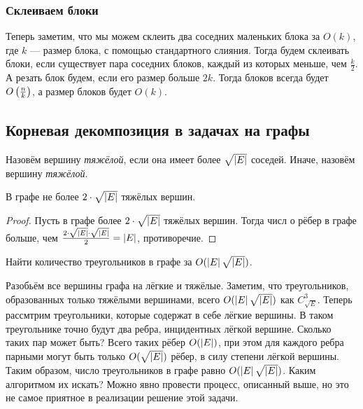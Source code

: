 \subsubsection{Склеиваем блоки}

Теперь заметим, что мы можем склеить два соседних маленьких блока за $O(k)$, где $k$ --- размер блока, с помощью стандартного слияния. Тогда будем склеивать блоки, если существует пара соседних блоков, каждый из которых меньше, чем $\frac{k}{2}$. А резать блок будем, если его размер больше $2k$. Тогда блоков всегда будет $O\left(\frac{n}{k}\right)$, а размер блоков будет $O(k)$.

\subsection{Корневая декомпозиция в задачах на графы}

\begin{definition}
    Назовём вершину \textit{тяжёлой}, если она имеет более $\sqrt{\left\lvert E\right\rvert}$ соседей. Иначе, назовём вершину \textit{тяжёлой}.
\end{definition}

\begin{lemma}
    В графе не более $2 \cdot \sqrt{\left\lvert E\right\rvert}$ тяжёлых вершин.
\end{lemma}

\begin{proof}
    Пусть в графе более $2 \cdot \sqrt{\left\lvert E\right\rvert}$ тяжёлых вершин. Тогда числ о рёбер в графе больше, чем $\frac{2 \cdot \sqrt{\left\lvert E\right\rvert} \cdot \sqrt{\left\lvert E\right\rvert}}{2} = \left\lvert E\right\rvert$, противоречие.
\end{proof}

\begin{problem}
    Найти количество треугольников в графе за $O(\left\lvert E\right\rvert\sqrt{\left\lvert E\right\rvert})$.
\end{problem}

Разобьём все вершины графа на лёгкие и тяжёлые. Заметим, что треугольников, образованных только тяжёлыми вершинами, всего $O(\left\lvert E\right\rvert\sqrt{\left\lvert E\right\rvert})$ как $C_{\sqrt{E}}^3$. Теперь рассмтрим треугольники, которые содержат в себе лёгкие вершины. В таком треугольнике точно будут два ребра, инцидентных лёгкой вершине. Сколько таких пар может быть? Всего таких рёбер $O(\left\lvert E\right\rvert)$, при этом для каждого ребра парными могут быть только $O(\sqrt{\left\lvert E\right\rvert})$ рёбер, в силу степени лёгкой вершины. Таким образом, число треугольников в графе равно $O(\left\lvert E\right\rvert\sqrt{\left\lvert E\right\rvert})$. Каким алгоритмом их искать? Можно явно провести процесс, описанный выше, но это не самое приятное в реализации решение этой задачи.

